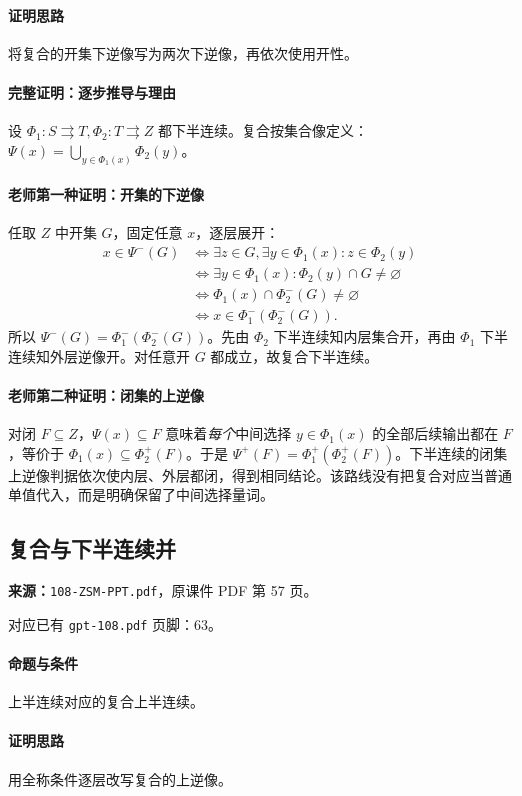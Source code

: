 \paragraph{证明思路}将复合的开集下逆像写为两次下逆像，再依次使用开性。
\paragraph{完整证明：逐步推导与理由}

设 $\Phi_1:S\rightrightarrows T,\Phi_2:T\rightrightarrows Z$ 都下半连续。复合按集合像定义：$\Psi(x)=\bigcup_{y\in\Phi_1(x)}\Phi_2(y)$。
\paragraph{老师第一种证明：开集的下逆像}
任取 $Z$ 中开集 $G$，固定任意 $x$，逐层展开：
\begin{align*}
x\in\Psi^-(G)&\iff\exists z\in G,\exists y\in\Phi_1(x):z\in\Phi_2(y)\\
&\iff\exists y\in\Phi_1(x):\Phi_2(y)\cap G\ne\varnothing\\
&\iff\Phi_1(x)\cap\Phi_2^-(G)\ne\varnothing\\
&\iff x\in\Phi_1^-(\Phi_2^-(G)).
\end{align*}
所以 $\Psi^-(G)=\Phi_1^-(\Phi_2^-(G))$。先由 $\Phi_2$ 下半连续知内层集合开，再由 $\Phi_1$ 下半连续知外层逆像开。对任意开 $G$ 都成立，故复合下半连续。
\paragraph{老师第二种证明：闭集的上逆像}
对闭 $F\subseteq Z$，$\Psi(x)\subseteq F$ 意味着\emph{每个}中间选择 $y\in\Phi_1(x)$ 的全部后续输出都在 $F$，等价于 $\Phi_1(x)\subseteq\Phi_2^+(F)$。于是 $\Psi^+(F)=\Phi_1^+(\Phi_2^+(F))$。下半连续的闭集上逆像判据依次使内层、外层都闭，得到相同结论。该路线没有把复合对应当普通单值代入，而是明确保留了中间选择量词。

\clearpage\subsection{复合与下半连续并}
\textbf{来源：}\texttt{108-ZSM-PPT.pdf}，原课件 PDF 第 57 页。\par
对应已有 \texttt{gpt-108.pdf} 页脚：63。\par
\paragraph{命题与条件}上半连续对应的复合上半连续。
\paragraph{证明思路}用全称条件逐层改写复合的上逆像。
